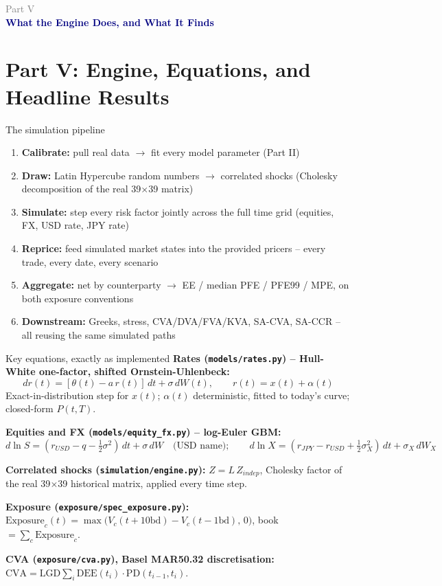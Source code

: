 \documentclass[8pt,aspectratio=169]{beamer}
\newcommand{\partframe}[2]{%
\begin{frame}
  \vspace{1.2cm}
  {\large\textcolor{grey}{Part #1}}\\[4pt]
  {\Large\textcolor{navy}{\textbf{#2}}}
\end{frame}}
\begin{document}
\partframe{V}{What the Engine Does, and What It Finds}
\section{Part V: Engine, Equations, and Headline Results}

\begin{frame}{The simulation pipeline}
  \begin{enumerate}
    \item \textbf{Calibrate:} pull real data $\to$ fit every model parameter (Part II)
    \item \textbf{Draw:} Latin Hypercube random numbers $\to$ correlated shocks (Cholesky decomposition of the real 39$\times$39 matrix)
    \item \textbf{Simulate:} step every risk factor jointly across the full time grid (equities, FX, USD rate, JPY rate)
    \item \textbf{Reprice:} feed simulated market states into the provided pricers -- every trade, every date, every scenario
    \item \textbf{Aggregate:} net by counterparty $\to$ EE / median PFE / PFE99 / MPE, on both exposure conventions
    \item \textbf{Downstream:} Greeks, stress, CVA/DVA/FVA/KVA, SA-CVA, SA-CCR -- all reusing the same simulated paths
  \end{enumerate}
\end{frame}

\begin{frame}{Key equations, exactly as implemented}
  \small
  \textbf{Rates (\texttt{models/rates.py}) -- Hull-White one-factor, shifted Ornstein-Uhlenbeck:}
  \[ dr(t) = [\theta(t) - a\,r(t)]\,dt + \sigma\,dW(t), \qquad r(t) = x(t) + \alpha(t) \]
  Exact-in-distribution step for $x(t)$; $\alpha(t)$ deterministic, fitted to today's curve; closed-form $P(t,T)$.

  \textbf{Equities and FX (\texttt{models/equity\_fx.py}) -- log-Euler GBM:}
  \[ d\ln S = (r_{USD} - q - \tfrac12\sigma^2)\,dt + \sigma\,dW \quad\text{(USD name)}; \qquad d\ln X = (r_{JPY}-r_{USD}+\tfrac12\sigma_X^2)\,dt + \sigma_X\,dW_X \]

  \textbf{Correlated shocks (\texttt{simulation/engine.py}):} $Z = L\,Z_{indep}$, Cholesky factor of the real 39$\times$39 historical matrix, applied every time step.

  \textbf{Exposure (\texttt{exposure/spec\_exposure.py}):} $\text{Exposure}_c(t) = \max\big(V_c(t{+}10\text{bd}) - V_c(t{-}1\text{bd}),\,0\big)$, book $= \sum_c \text{Exposure}_c$.

  \textbf{CVA (\texttt{exposure/cva.py}), Basel MAR50.32 discretisation:} $\text{CVA} = \text{LGD}\sum_i \text{DEE}(t_i)\cdot\text{PD}(t_{i-1},t_i)$.
\end{frame}
\end{document}
